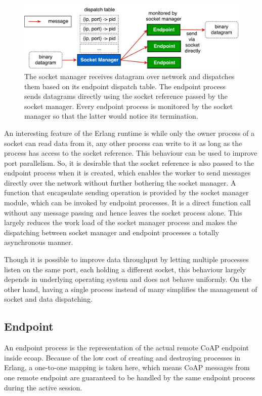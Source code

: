 \begin{figure}[!htbp]
\centering
\includegraphics[scale = 0.55]{coap_socket_manager}
\caption{The socket manager receives datagram over network and dispatches them based on its endpoint dispatch table. The endpoint process sends datagrams directly using the socket reference passed by the socket manager. Every endpoint process is monitored by the socket manager so that the latter would notice its termination.}
\label{fig:coap_socket_manager}
\end{figure}

An interesting feature of the Erlang runtime is while only the owner process of a socket can read data from it, any other process can write to it as long as the process has access to the socket reference. This behaviour can be used to improve port parallelism. So, it is desirable that the socket reference is also passed to the endpoint process when it is created, which enables the worker to send messages directly over the network without further bothering the socket manager. A function that encapsulate sending operation is provided by the socket manager module, which can be invoked by endpoint processes. It is a direct function call without any message passing and hence leaves the socket process alone. This largely reduces the work load of the socket manager process and makes the dispatching between socket manager and endpoint processes a totally asynchronous manner.

Though it is possible to improve data throughput by letting multiple processes listen on the same port, each holding a different socket, this behaviour largely depends in underlying operating system and does not behave uniformly. On the other hand, having a single process instead of many simplifies the management of socket and data dispatching.

\subsection{Endpoint}\label{coap_endpoint}

An endpoint process is the representation of the actual remote CoAP endpoint inside ecoap. Because of the low cost of creating and destroying processes in Erlang, a one-to-one mapping is taken here, which means CoAP messages from one remote endpoint are guaranteed to be handled by the same endpoint process during the active session.

